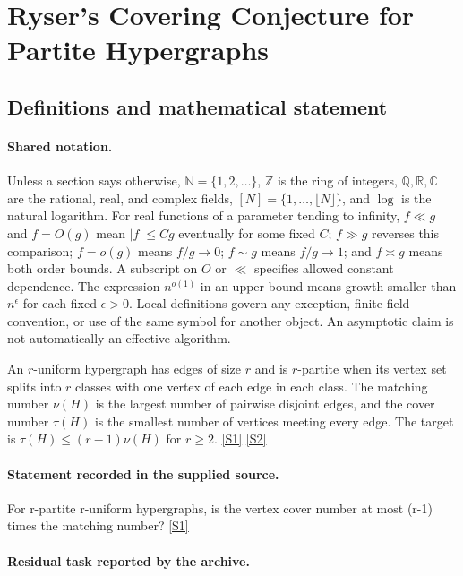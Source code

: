 \documentclass[11pt,a4paper]{article}
\newcommand{\N}{\mathbb{N}}
\newcommand{\Z}{\mathbb{Z}}
\newcommand{\Q}{\mathbb{Q}}
\newcommand{\R}{\mathbb{R}}
\newcommand{\C}{\mathbb{C}}
\newcommand{\sref}[2]{\hyperlink{source:#1:#2}{[S#2]}}
\begin{document}
\section{Ryser’s Covering Conjecture for Partite Hypergraphs}\label{statement}


\subsection{Definitions and mathematical statement}

\paragraph{Shared notation.}Unless a section says otherwise, $\N=\{1,2,\ldots\}$,
$\Z$ is the ring of integers, $\Q,\R,\C$ are the rational, real, and complex
fields, $[N]=\{1,\ldots,\lfloor N\rfloor\}$, and $\log$ is the natural
logarithm. For real functions of a parameter tending to infinity,
$f\ll g$ and $f=O(g)$ mean $|f|\leq Cg$ eventually for some fixed $C$;
$f\gg g$ reverses this comparison; $f=o(g)$ means $f/g\to0$;
$f\sim g$ means $f/g\to1$; and $f\asymp g$ means both order bounds.
A subscript on $O$ or $\ll$ specifies allowed constant dependence.
The expression $n^{o(1)}$ in an upper bound means growth smaller than
$n^\epsilon$ for each fixed $\epsilon>0$. Local definitions govern any
exception, finite-field convention, or use of the same symbol for another
object. An asymptotic claim is not automatically an effective algorithm.



An $r$-uniform hypergraph has edges of size $r$ and is $r$-partite when its vertex set splits into $r$ classes with one vertex of each edge in each class. The matching number $\nu(H)$ is the largest number of pairwise disjoint edges, and the cover number $\tau(H)$ is the smallest number of vertices meeting every edge. The target is $\tau(H)\leq(r-1)\nu(H)$ for $r\geq2$. \sref{statement}{1} \sref{statement}{2}

\paragraph{Statement recorded in the supplied source.}
For r-partite r-uniform hypergraphs, is the vertex cover number at most (r-1) times the matching number? \sref{statement}{1}

\paragraph{Residual task reported by the archive.}
\end{document}
